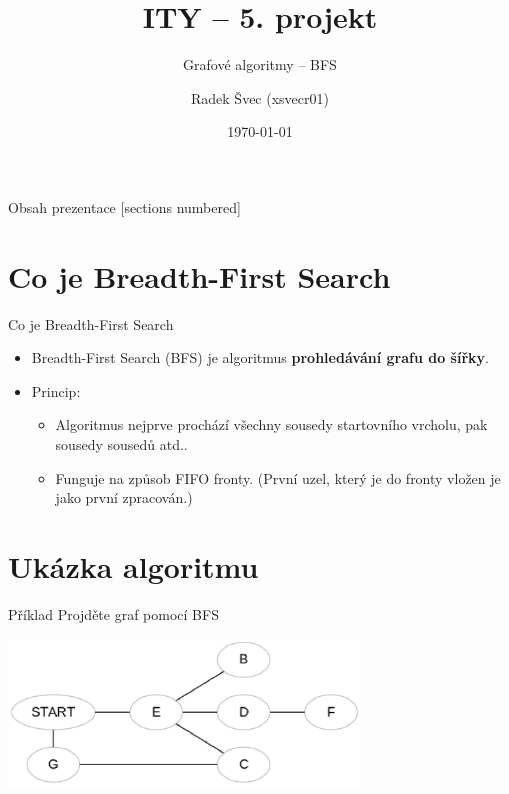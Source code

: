 \documentclass{beamer}
\title{ITY -- 5. projekt}
\subtitle{Grafové algoritmy -- BFS}
\author{Radek Švec (xsvecr01)}
\institute[VUT FIT]{Vysoké učení technické v Brně \\
                    Fakulta informačních technologií}
\date{\today}
\begin{document}
\begin{frame}
  \titlepage
\end{frame}

\begin{frame}{Obsah prezentace}
    [sections numbered]
	\tableofcontents[hideallsubsections]
\end{frame}

\section{Co je Breadth-First Search}
\begin{frame}{Co je Breadth-First Search}
	\begin{itemize}
		\item
		Breadth-First Search (\alert{BFS}) je algoritmus \textbf{prohledávání grafu do šířky}.
		\item
			Princip:
			\begin{itemize}
				\item Algoritmus nejprve prochází všechny sousedy startovního vrcholu, pak sousedy sousedů atd..
				\item Funguje na způsob \alert{FIFO} fronty. (První uzel, který je do fronty vložen je jako první zpracován.)
			\end{itemize}
	\end{itemize}
\end{frame}

\section{Ukázka algoritmu}
\begin{frame}{Příklad}
    Projděte graf pomocí BFS
    \begin{center}
      \centering\includegraphics[width=0.7\textwidth]{./img/1.eps}
    \end{center}
\end{frame}
\end{document}
